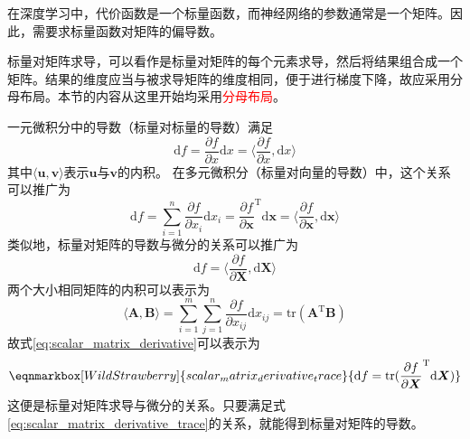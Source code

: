 在深度学习中，代价函数是一个标量函数，而神经网络的参数通常是一个矩阵。因此，需要求标量函数对矩阵的偏导数。

标量对矩阵求导，可以看作是标量对矩阵的每个元素求导，然后将结果组合成一个矩阵。结果的维度应当与被求导矩阵的维度相同，便于进行梯度下降，故应采用分母布局。本节的内容从这里开始均采用\textcolor{red}{分母布局}。

一元微积分中的导数（标量对标量的导数）满足
\begin{equation}
	\mathrm{d}f 
	= \frac{\partial f}{\partial x}\mathrm{d}x
	= \langle \frac{\partial f}{\partial x}, \mathrm{d}x \rangle
\end{equation}
其中$\langle \bm{u}, \bm{v} \rangle$表示$\bm{u}$与$\bm{v}$的内积。
在多元微积分（标量对向量的导数）中，这个关系可以推广为
\begin{equation}
	\mathrm{d}f
	= \sum_{i=1}^{n}{\frac{\partial f}{\partial x_i}\mathrm{d}x_i} 
	= {\frac{\partial f}{\partial \bm{x}}}^{\mathrm{T}}\mathrm{d}\bm{x}
	= \langle \frac{\partial f}{\partial \bm{x}}, \mathrm{d}\bm{x} \rangle
\end{equation}
类似地，标量对矩阵的导数与微分的关系可以推广为
\begin{equation}
	\mathrm{d}f
	= \langle \frac{\partial f}{\partial \bm{X}}, \mathrm{d}\bm{X} \rangle
	\label{eq:scalar_matrix_derivative}
\end{equation}
两个大小相同矩阵的内积可以表示为
\begin{equation}
	\langle \bm{A}, \bm{B} \rangle 
	= \sum_{i=1}^{m}{\sum_{j=1}^{n}{\frac{\partial f}{\partial x_{ij}}\mathrm{d}x_{ij}}} 
	= \mathrm{tr}(\bm{A}^{\mathrm{T}}\bm{B})
\end{equation}
故式\eqref{eq:scalar_matrix_derivative}可以表示为
\begin{equation}
	\eqnmarkbox[WildStrawberry]{scalar_matrix_derivative_trace}{
	\mathrm{d}f 
	= \mathrm{tr}({\frac{\partial f}{\partial \bm{X}}}^{\mathrm{T}}\mathrm{d}\bm{X})
	}
	\label{eq:scalar_matrix_derivative_trace}
\end{equation}
这便是标量对矩阵求导与微分的关系。只要满足式\eqref{eq:scalar_matrix_derivative_trace}的关系，就能得到标量对矩阵的导数。

